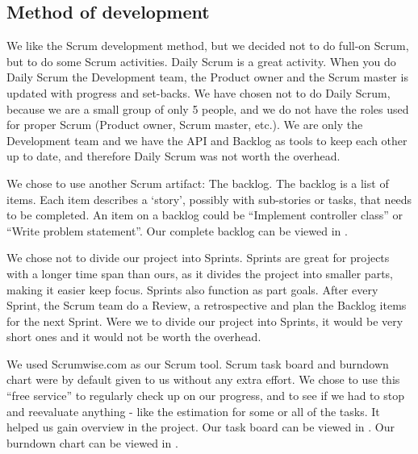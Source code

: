 \subsection{Method of development}
We like the Scrum development method, but we decided not to do full-on Scrum, but to do some Scrum activities. Daily Scrum is a great activity. When you do Daily Scrum the Development team, the Product owner and the Scrum master is updated with progress and set-backs. We have chosen not to do Daily Scrum, because we are a small group of only 5 people, and we do not have the roles used for proper Scrum (Product owner, Scrum master, etc.). We are only the Development team and we have the API and Backlog as tools to keep each other up to date, and therefore Daily Scrum was not worth the overhead.

We chose to use another Scrum artifact: The backlog. The backlog is a list of items. Each item describes a `story', possibly with sub-stories or tasks, that needs to be completed. An item on a backlog could be ``Implement controller class'' or ``Write problem statement''. Our complete backlog can be viewed in .

We chose not to divide our project into Sprints. Sprints are great for projects with a longer time span than ours, as it divides the project into smaller parts, making it easier keep focus. Sprints also function as part goals. After every Sprint, the Scrum team do a Review, a retrospective and plan the Backlog items for the next Sprint. Were we to divide our project into Sprints, it would be very short ones and it would not be worth the overhead.

We used Scrumwise.com as our Scrum tool. Scrum task board and burndown chart were by default given to us without any extra effort. We chose to use this ``free service'' to regularly check up on our progress, and to see if we had to stop and reevaluate anything - like the estimation for some or all of the tasks. It helped us gain overview in the project. Our task board can be viewed in . Our burndown chart can be viewed in .